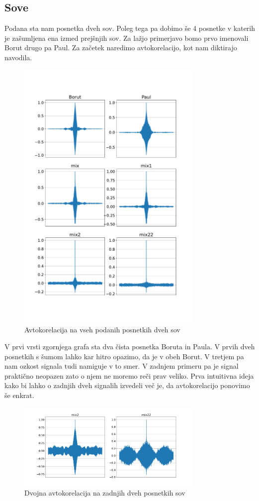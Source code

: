 \documentclass{article}
\begin{document}
\subsection{Sove}
Podana sta nam posnetka dveh sov. Poleg tega pa dobimo še 4 posnetke v katerih je zašumljena ena izmed prejšnjih sov. Za lažjo primerjavo bomo prvo imenovali Borut drugo pa Paul. Za začetek naredimo avtokorelacijo, kot nam diktirajo navodila. 
\begin{figure}[H]
    \centering
    \includegraphics[width=0.8\textwidth]{autocor1.pdf}
	\caption{Avtokorelacija na vseh podanih posnetkih dveh sov}
    \label{fig:example}
\end{figure}
V prvi vrsti zgornjega grafa sta dva čista posnetka Boruta in Paula. V prvih dveh posnetkih s šumom lahko kar hitro opazimo, da je v obeh Borut. V tretjem pa nam ozkost signala tudi namiguje v to smer. V zadnjem primeru pa je signal praktično neopazen zato o njem ne moremo reči prav veliko. Prva intuitivna ideja kako bi lahko o zadnjih dveh signalih izvedeli več je, da avtokorelacijo ponovimo še enkrat.
\begin{figure}[H]
    \centering
    \includegraphics[width=0.8\textwidth]{autocor2.pdf}
	\caption{Dvojna avtokorelacija na zadnjih dveh posnetkih sov}
    \label{fig:example}
\end{figure}
\end{document}
